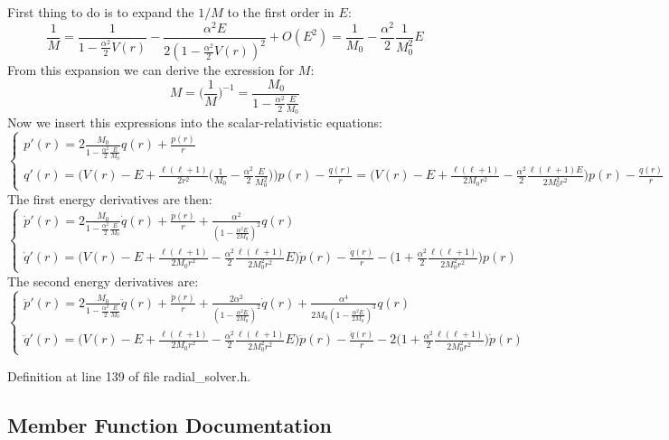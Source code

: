 First thing to do is to expand the $ 1/M $ to the first order in $ E $\+: \[ \frac{1}{M} = \frac{1}{1-\frac{\alpha^2}{2} V(r)} - \frac{\alpha^2 E}{2 (1-\frac{\alpha^2}{2} V(r))^2} + O(E^2) = \frac{1}{M_0} - \frac{\alpha^2}{2} \frac{1}{M_0^2} E \] From this expansion we can derive the exression for $ M $\+: \[ M = \Big(\frac{1}{M}\Big)^{-1} = \frac{M_0}{1 - \frac{\alpha^2}{2}\frac{E}{M_0}} \] Now we insert this expressions into the scalar-\/relativistic equations\+: \[ \left\{ \begin{array}{ll} \displaystyle p'(r) = 2 \frac{M_0}{1 - \frac{\alpha^2}{2}\frac{E}{M_0}} q(r) + \frac{p(r)}{r} \\ \displaystyle q'(r) = \Big(V(r) - E + \frac{\ell(\ell+1)}{2r^2} \big(\frac{1}{M_0} - \frac{\alpha^2}{2} \frac{E}{M_0^2} \big) \Big) p(r) - \frac{q(r)}{r} = \Big(V(r) - E + \frac{\ell(\ell+1)}{2 M_0 r^2} - \frac{\alpha^2}{2} \frac{\ell(\ell+1) E}{2 M_0^2 r^2} \Big) p(r) - \frac{q(r)}{r} \end{array} \right. \] The first energy derivatives are then\+: \[ \left\{ \begin{array}{ll} \displaystyle \dot{p}'(r) = 2 \frac{M_0}{1 - \frac{\alpha^2}{2}\frac{E}{M_0}} \dot{q}(r) + \frac{\dot{p}(r)}{r} + \frac{\alpha^2}{(1 - \frac{\alpha^2 E}{2 M_0})^2} q(r) \\ \displaystyle \dot{q}'(r) = \Big(V(r) - E + \frac{\ell(\ell+1)}{2 M_0 r^2} - \frac{\alpha^2}{2} \frac{\ell(\ell+1)}{2 M_0^2 r^2} E \Big) \dot{p}(r) - \frac{\dot{q}(r)}{r} - \Big(1 + \frac{\alpha^2}{2} \frac{\ell(\ell+1)}{2 M_0^2 r^2} \Big) p(r) \end{array} \right. \] The second energy derivatives are\+: \[ \left\{ \begin{array}{ll} \displaystyle \ddot{p}'(r) = 2 \frac{M_0}{1 - \frac{\alpha^2}{2}\frac{E}{M_0}} \ddot{q}(r) + \frac{\ddot{p}(r)}{r} + \frac{2 \alpha^2}{(1 - \frac{\alpha^2 E}{2 M_0})^2} \dot{q}(r) + \frac{\alpha^4}{2 M_0 (1 - \frac{\alpha^2 E}{2 M_0})^3} q(r) \\ \displaystyle \ddot{q}'(r) = \Big(V(r) - E + \frac{\ell(\ell+1)}{2 M_0 r^2} - \frac{\alpha^2}{2} \frac{\ell(\ell+1)}{2 M_0^2 r^2} E \Big) \ddot{p}(r) - \frac{\ddot{q}(r)}{r} - 2 \Big(1 + \frac{\alpha^2}{2} \frac{\ell(\ell+1)}{2 M_0^2 r^2} \Big) \dot{p}(r) \end{array} \right. \] 

Definition at line 139 of file radial\+\_\+solver.\+h.



\subsection{Member Function Documentation}
\hypertarget{classsirius_1_1_radial__solver_a72eaf443ca2f81c7d416d0c4f04e7ebb}{}
